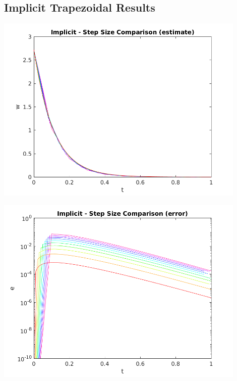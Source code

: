 \documentclass{article}
\begin{document}
\subsection{Implicit Trapezoidal Results}
\label{results:implicit}


\begin{center}
  \includegraphics[width=0.9\textwidth]{../output/a_implicit_h_val.png}
  \label{fig:a_implicit_h_val}
\end{center}

\begin{center}
  \includegraphics[width=0.9\textwidth]{../output/a_implicit_h_err.png}
  \label{fig:a_implicit_h_err}
\end{center}
\end{document}
